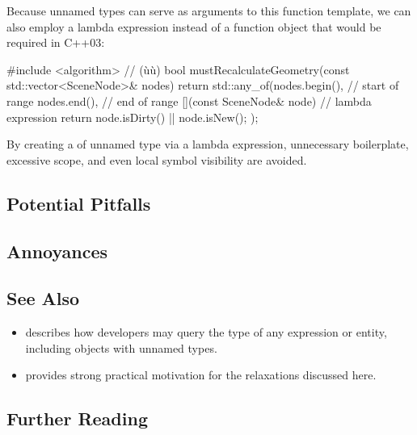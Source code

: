 \noindent Because unnamed types can serve as arguments to this function template, we can also employ a lambda expression instead of a function object that would be required in C++03:

\begin{emcppslisting}[emcppsbatch=e5]
#include <algorithm> // (ù{}ù)
bool mustRecalculateGeometry(const std::vector<SceneNode>& nodes)
{
    return std::any_of(nodes.begin(),             // start of range
                       nodes.end(),               // end of range
                       [](const SceneNode& node)  // lambda expression
                       {
                           return node.isDirty() || node.isNew();
                       }
                      );
}
\end{emcppslisting}

\noindent By creating a  of unnamed type via a lambda
expression, unnecessary boilerplate, excessive scope, and even local
symbol visibility are avoided.

\subsection[Potential Pitfalls]{Potential Pitfalls}\label{potential-pitfalls}

\hspace{\fill}

\subsection[Annoyances]{Annoyances}\label{annoyances}

\hspace{\fill}

\subsection[See Also]{See Also}\label{see-also}

\begin{itemize}
\item{describes how developers may query the type of any expression or entity, including objects with unnamed types.}
\item{provides strong practical motivation for the relaxations discussed here.}
\end{itemize}

\subsection[Further Reading]{Further Reading}\label{further-reading}

\hspace{\fill}



